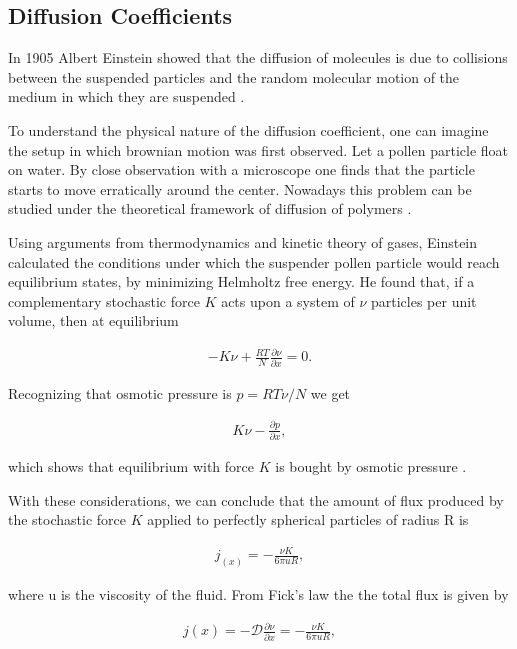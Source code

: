\subsection{Diffusion Coefficients}

In 1905 Albert Einstein showed that the diffusion of molecules is due to collisions between the suspended particles and the random molecular motion of the medium in which they are suspended \cite{einstein}. 

To understand the physical nature of the diffusion coefficient, one can imagine the setup in which brownian motion was first observed. Let a pollen particle float on water. By close observation with a microscope one finds that the particle starts to move erratically around the center. Nowadays this problem can be studied under the theoretical framework of diffusion of polymers \cite{bird}.

Using arguments from thermodynamics and kinetic theory of gases, Einstein calculated the conditions under which the suspender pollen particle would reach equilibrium states, by minimizing Helmholtz free energy. He found that, if a complementary stochastic force $K$ acts upon a system of $\nu$ particles per unit volume, then at equilibrium

\begin{align}
	-K\nu +\frac{RT}{N}\frac{\partial \nu}{\partial x} = 0.
\end{align} 

Recognizing that osmotic pressure is $p = RT \nu /N$ we get

\begin{align}
\label{eq:einstein-result}
	K\nu - \frac{\partial p}{\partial x},
\end{align}

which shows that equilibrium with force $K$ is bought by osmotic pressure \cite{einstein}. 

With these considerations, we can conclude that the amount of flux produced by the stochastic force $K$ applied to perfectly spherical particles of radius R is

\begin{align}
	j_(x) = -\frac{\nu K}{6\pi u R},
\end{align}

where u is the viscosity of the fluid. From Fick's law the the total flux is given by

\begin{align}
	j(x) = -\mathcal{D}\frac{\partial \nu}{\partial x} = - \frac{\nu K}{6\pi u R},
\end{align}

